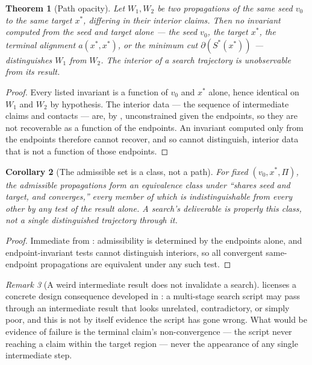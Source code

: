 \documentclass[11pt,twocolumn,a4paper]{article}
\theoremstyle{thmstyle}
\newtheorem{theorem}{Theorem}[section]
\newtheorem{corollary}[theorem]{Corollary}
\theoremstyle{definition}
\theoremstyle{remark}
\newtheorem{remark}[theorem]{Remark}
\newcommand{\cut}{\partial}
\newcommand{\Walk}{W}
\newcommand{\Proc}{\Pi}
\begin{document}
\begin{theorem}[Path opacity]
\label{thm:path-opacity}
Let $\Walk_1,\Walk_2$ be two propagations of the same seed $v_0$ to the
same target $x^{\ast}$, differing in their interior claims. Then no
invariant computed from the seed and target alone --- the seed $v_0$, the
target $x^{\ast}$, the terminal alignment $a(x^{\ast},x^{\ast})$, or the
minimum cut $\cut(S^{\ast}(x^{\ast}))$ --- distinguishes $\Walk_1$ from
$\Walk_2$. The interior of a search trajectory is unobservable from its
result.
\end{theorem}

\begin{proof}
Every listed invariant is a function of $v_0$ and $x^{\ast}$ alone, hence
identical on $\Walk_1$ and $\Walk_2$ by hypothesis. The interior data ---
the sequence of intermediate claims and contacts --- are, by
, unconstrained given the endpoints, so they are
not recoverable as a function of the endpoints. An invariant computed only
from the endpoints therefore cannot recover, and so cannot distinguish,
interior data that is not a function of those endpoints.
\end{proof}

\begin{corollary}[The admissible set is a class, not a path]
\label{cor:gauge}
For fixed $(v_0,x^{\ast},\Proc)$, the admissible propagations form an
equivalence class under ``shares seed and target, and converges,'' every
member of which is indistinguishable from every other by any test of the
result alone. A search's deliverable is properly this class, not a single
distinguished trajectory through it.
\end{corollary}

\begin{proof}
Immediate from : admissibility is
determined by the endpoints alone, and endpoint-invariant tests cannot
distinguish interiors, so all convergent same-endpoint propagations are
equivalent under any such test.
\end{proof}

\begin{remark}[A weird intermediate result does not invalidate a search]
\label{rem:weird-intermediate}
 licenses a concrete design consequence developed
in : a multi-stage search script may pass through
an intermediate result that looks unrelated, contradictory, or simply
poor, and this is not by itself evidence the script has gone wrong. What
would be evidence of failure is the terminal claim's non-convergence ---
the script never reaching a claim within the target region --- never the
appearance of any single intermediate step.
\end{remark}
\end{document}
